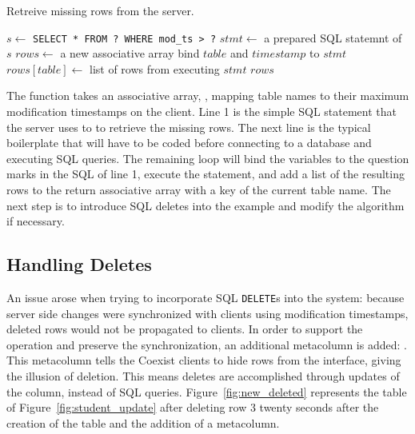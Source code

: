 \begin{algorithm}[h]
\caption{Retreive missing rows from the server.}
\label{alg:sync}
\begin{algorithmic}[1]


  \STATE $s \gets $ \texttt{\sq SELECT * FROM ? WHERE mod\_ts > ?\sq}
  \STATE $stmt \gets $ a prepared SQL statemnt of $s$
  \STATE $rows \gets$ a new associative array
    \STATE bind $table$ and $timestamp$ to $stmt$
    \STATE $rows[table] \gets$ list of rows from executing $stmt$
  \ENDFOR
  \RETURN $rows$
  
\end{algorithmic}
\end{algorithm}

The  function takes an associative array, , mapping table
names to their maximum modification timestamps on the client. Line 1 is the
simple SQL statement that the server uses to to retrieve the missing rows.
The next line is the typical boilerplate that will have to be coded before
connecting to a database and executing SQL queries. The remaining loop will bind
the variables to the question marks in the SQL of line 1, execute the statement,
and add a list of the resulting rows to the return associative array with a key
of the current table name.  The next step is to introduce SQL deletes into the
example and modify the algorithm if necessary.

\subsection{Handling Deletes}  \label{sec:}


An issue arose when trying to incorporate SQL \texttt{DELETE}s into the
system: because server side changes were synchronized with clients using
\mbox{modification} timestamps, deleted rows would not be propagated to clients.
In order to support the  operation and preserve the synchronization,
an additional metacolumn is added: .  This metacolumn tells the
Coexist clients to hide rows from the interface, giving the illusion of
deletion.  This means deletes are accomplished through updates of the
 column, instead of SQL  queries.
Figure~\ref{fig:new_deleted} represents the  table of
Figure~\ref{fig:student_update} after deleting row 3 twenty seconds after the
creation of the table and the addition of a  metacolumn.


